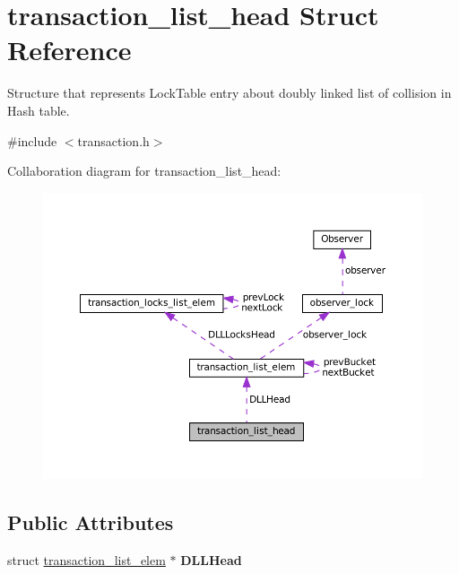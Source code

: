 \hypertarget{structtransaction__list__head}{}\section{transaction\+\_\+list\+\_\+head Struct Reference}
\label{structtransaction__list__head}


Structure that represents Lock\+Table entry about doubly linked list of collision in Hash table.  




{\ttfamily \#include $<$transaction.\+h$>$}



Collaboration diagram for transaction\+\_\+list\+\_\+head\+:\nopagebreak
\begin{figure}[H]
\begin{center}
\leavevmode
\includegraphics[width=350pt]{structtransaction__list__head__coll__graph}
\end{center}
\end{figure}
\subsection*{Public Attributes}
\begin{DoxyCompactItemize}
\item 
\mbox{\label{structtransaction__list__head_aa77cdca14266fe533d9ca82bb3d3e8ac}} 
struct \hyperlink{structtransaction__list__elem}{transaction\+\_\+list\+\_\+elem} $\ast$ {\bfseries D\+L\+L\+Head}
\end{DoxyCompactItemize}


